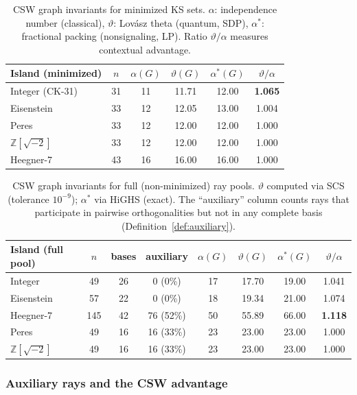 \documentclass[12pt,a4paper]{article}
\newcommand{\Z}{\mathbb{Z}}
\begin{document}
\begin{table}[ht]
\centering
\caption{CSW graph invariants for minimized KS sets. $\alpha$: independence number (classical), $\vartheta$: Lov\'asz theta (quantum, SDP), $\alpha^*$: fractional packing (nonsignaling, LP). Ratio $\vartheta/\alpha$ measures contextual advantage.}
\label{tab:csw-min}
\begin{tabular}{lccccc}
\toprule
Island (minimized) & $n$ & $\alpha(G)$ & $\vartheta(G)$ & $\alpha^*(G)$ & $\vartheta/\alpha$ \\
\midrule
Integer (CK-31) & 31 & 11 & 11.71 & 12.00 & \textbf{1.065} \\
Eisenstein & 33 & 12 & 12.05 & 13.00 & 1.004 \\
Peres & 33 & 12 & 12.00 & 12.00 & 1.000 \\
$\Z[\sqrt{-2}]$ & 33 & 12 & 12.00 & 12.00 & 1.000 \\
Heegner-7 & 43 & 16 & 16.00 & 16.00 & 1.000 \\
\bottomrule
\end{tabular}
\end{table}

\begin{table}[ht]
\centering
\caption{CSW graph invariants for full (non-minimized) ray pools. $\vartheta$ computed via SCS (tolerance $10^{-9}$); $\alpha^*$ via HiGHS (exact). The ``auxiliary'' column counts rays that participate in pairwise orthogonalities but not in any complete basis (Definition~\ref{def:auxiliary}).}
\label{tab:csw-pool}
\begin{tabular}{lccccccc}
\toprule
Island (full pool) & $n$ & bases & auxiliary & $\alpha(G)$ & $\vartheta(G)$ & $\alpha^*(G)$ & $\vartheta/\alpha$ \\
\midrule
Integer & 49 & 26 & 0 (0\%) & 17 & 17.70 & 19.00 & 1.041 \\
Eisenstein & 57 & 22 & 0 (0\%) & 18 & 19.34 & 21.00 & 1.074 \\
Heegner-7 & 145 & 42 & 76 (52\%) & 50 & 55.89 & 66.00 & \textbf{1.118} \\
Peres & 49 & 16 & 16 (33\%) & 23 & 23.00 & 23.00 & 1.000 \\
$\Z[\sqrt{-2}]$ & 49 & 16 & 16 (33\%) & 23 & 23.00 & 23.00 & 1.000 \\
\bottomrule
\end{tabular}
\end{table}

\subsubsection{Auxiliary rays and the CSW advantage}
\end{document}
